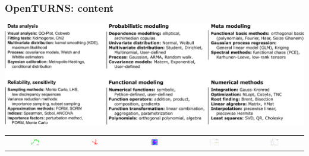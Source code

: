 \documentclass{beamer}
\begin{document}

\begin{frame}[containsverbatim]
\frametitle{OpenTURNS: content}

    \begin{center}
    \includegraphics[width=\textwidth]{figures/OpenTURNS-Content-Table.pdf}
    \end{center}

   \begin{tabular}{@{}c@{}c@{}c@{}c@{}c@{}}
   \includegraphics[width=0.2\textwidth]{figures/plot_kriging.png}&
   \includegraphics[width=0.2\textwidth]{figures/plot_random_walk.png}&
   \includegraphics[width=0.2\textwidth]{figures/plot_sobol_field.png}&
   \includegraphics[width=0.2\textwidth]{figures/plot_monte_carlo.png}&
   \includegraphics[width=0.2\textwidth]{figures/plot_distribution_fitting.png}
   \end{tabular}
\end{frame}
\end{document}
